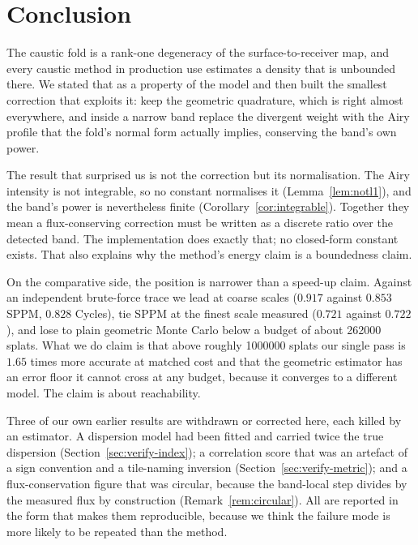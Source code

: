 \section{Conclusion}
\label{sec:conclusion}

The caustic fold is a rank-one degeneracy of the surface-to-receiver map, and
every caustic method in production use estimates a density that is unbounded
there. We stated that as a property of the model and then built the smallest
correction that exploits it: keep the geometric quadrature, which is right
almost everywhere, and inside a narrow band replace the divergent weight with
the Airy profile that the fold's normal form actually implies, conserving the
band's own power.

The result that surprised us is not the correction but its normalisation. The
Airy intensity is not integrable, so no constant normalises it
(Lemma~\ref{lem:notl1}), and the band's power is nevertheless finite
(Corollary~\ref{cor:integrable}). Together they mean a flux-conserving correction
must be written as a discrete ratio over the detected band. The implementation does exactly that; no closed-form constant exists. That also
explains why the method's energy claim is a boundedness claim.

On the comparative side, the position is narrower than a speed-up claim. Against
an independent brute-force trace we lead at coarse scales ($0.917$ against
$0.853$ SPPM, $0.828$ Cycles), tie SPPM at the finest scale measured
($0.721$ against $0.722$), and lose to plain geometric Monte Carlo below a
budget of about \num{262000} splats. What we do claim is that above roughly
\num{1000000} splats our single pass is $1.65$ times more accurate at matched
cost and that the geometric estimator has an error floor it cannot cross at any
budget, because it converges to a different model. The claim is about reachability.

Three of our own earlier results are withdrawn or corrected here, each killed by an estimator. A dispersion model had been fitted and carried twice the true dispersion
(Section~\ref{sec:verify-index}); a correlation score that was an artefact of a
sign convention and a tile-naming inversion (Section~\ref{sec:verify-metric});
and a flux-conservation figure that was circular, because the band-local step
divides by the measured flux by construction
(Remark~\ref{rem:circular}). All are reported in the form that makes them
reproducible, because we think the failure mode is more likely to be repeated
than the method.

